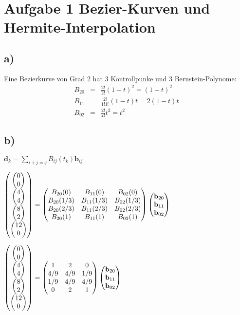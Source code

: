 
\section*{Aufgabe 1 Bezier-Kurven und Hermite-Interpolation}

\subsection*{a)}
Eine Bezierkurve von Grad 2 hat 3 Kontrollpunke und 3 Bernstein-Polynome:
\begin{eqnarray}
    B_{20}&=& \frac{2!}{2!}\left(1-t \right)^2 = \left(1-t \right)^2\\
    B_{11}&=& \frac{2!}{1!1!}\left(1-t \right)t = 2 \left(1-t \right)t  \\
    B_{02}&=& \frac{2!}{2!} t^2 = t^2  
\end{eqnarray}




\subsection*{b)}

$\mathbf{d}_k = \sum_{i+j=q} B_{ij}(t_k) \mathbf{b}_{ij}$

$\left( \begin{matrix} \left( \begin{matrix}0 \\ 0 \end{matrix}\right) \\ \left( \begin{matrix}4 \\ 4 \end{matrix}\right) \\ \left( \begin{matrix}8 \\ 2 \end{matrix}\right) \\ \left( \begin{matrix}12 \\ 0 \end{matrix}\right)\end{matrix}\right) = 
\left( \begin{matrix} 
    B_{20}(0) & B_{11}(0) &B_{02}(0) \\
    B_{20}(1/3) & B_{11}(1/3) &B_{02}(1/3) \\
    B_{20}(2/3) & B_{11}(2/3) &B_{02}(2/3) \\
    B_{20}(1) & B_{11}(1) &B_{02}(1) \\
\end{matrix} \right)  \left( \begin{matrix} \mathbf{b}_{20} \\ \mathbf{b}_{11} \\ \mathbf{b}_{02} \end{matrix}\right)$


$\left( \begin{matrix} \left( \begin{matrix}0 \\ 0 \end{matrix}\right) \\ \left( \begin{matrix}4 \\ 4 \end{matrix}\right) \\ \left( \begin{matrix}8 \\ 2 \end{matrix}\right) \\ \left( \begin{matrix}12 \\ 0 \end{matrix}\right)\end{matrix}\right) = 
\left( \begin{matrix} 
    1 & 2 &0 \\
    4/9 & 4/9 &1/9 \\
    1/9 & 4/9 & 4/9 \\
    0 & 2 &1  \\
\end{matrix} \right)  \left( \begin{matrix} \mathbf{b}_{20} \\ \mathbf{b}_{11} \\ \mathbf{b}_{02} \end{matrix}\right)$


